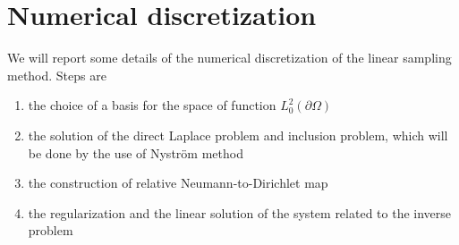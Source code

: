 \documentclass[10pt, a4paper, twoside, openright]{book}
\theoremstyle{definition}
\theoremstyle{plain}
\theoremstyle{plain}
\theoremstyle{plain}
\theoremstyle{plain}
\theoremstyle{plain}
\theoremstyle{plain}
\theoremstyle{plain}
\theoremstyle{plain}
\begin{document}
\section{Numerical discretization}
We will report some details of the numerical discretization of the linear sampling method. Steps are
\begin{enumerate}
 \item the choice of a basis for the space of function $L^2_0(\partial \Omega)$
 \item the solution of the direct Laplace problem and inclusion problem, which will be done by the use of Nystr\"om method
 \item the construction of relative Neumann-to-Dirichlet map
 \item the regularization and the linear solution of the system related to the inverse problem
\end{enumerate}
\end{document}
